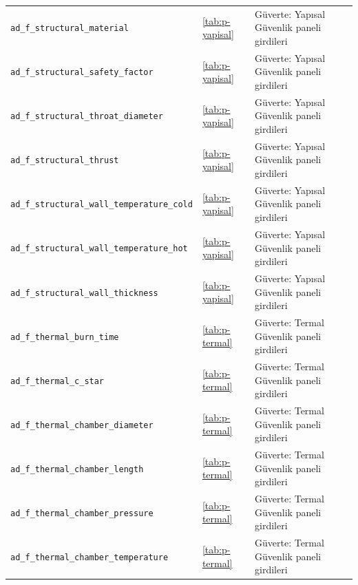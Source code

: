 \documentclass[11pt,a4paper]{article}
\begin{document}
{\begin{longtable}{@{}>{\raggedright\arraybackslash}p{5.2cm}p{1.4cm}>{\raggedright\arraybackslash}p{7.4cm}@{}}
\texttt{ad\_\allowbreak{}f\_\allowbreak{}structural\_\allowbreak{}material} & \ref{tab:p-yapisal} & Güverte: Yapısal Güvenlik paneli girdileri \\
\texttt{ad\_\allowbreak{}f\_\allowbreak{}structural\_\allowbreak{}safety\_\allowbreak{}factor} & \ref{tab:p-yapisal} & Güverte: Yapısal Güvenlik paneli girdileri \\
\texttt{ad\_\allowbreak{}f\_\allowbreak{}structural\_\allowbreak{}throat\_\allowbreak{}diameter} & \ref{tab:p-yapisal} & Güverte: Yapısal Güvenlik paneli girdileri \\
\texttt{ad\_\allowbreak{}f\_\allowbreak{}structural\_\allowbreak{}thrust} & \ref{tab:p-yapisal} & Güverte: Yapısal Güvenlik paneli girdileri \\
\texttt{ad\_\allowbreak{}f\_\allowbreak{}structural\_\allowbreak{}wall\_\allowbreak{}temperature\_\allowbreak{}cold} & \ref{tab:p-yapisal} & Güverte: Yapısal Güvenlik paneli girdileri \\
\texttt{ad\_\allowbreak{}f\_\allowbreak{}structural\_\allowbreak{}wall\_\allowbreak{}temperature\_\allowbreak{}hot} & \ref{tab:p-yapisal} & Güverte: Yapısal Güvenlik paneli girdileri \\
\texttt{ad\_\allowbreak{}f\_\allowbreak{}structural\_\allowbreak{}wall\_\allowbreak{}thickness} & \ref{tab:p-yapisal} & Güverte: Yapısal Güvenlik paneli girdileri \\
\texttt{ad\_\allowbreak{}f\_\allowbreak{}thermal\_\allowbreak{}burn\_\allowbreak{}time} & \ref{tab:p-termal} & Güverte: Termal Güvenlik paneli girdileri \\
\texttt{ad\_\allowbreak{}f\_\allowbreak{}thermal\_\allowbreak{}c\_\allowbreak{}star} & \ref{tab:p-termal} & Güverte: Termal Güvenlik paneli girdileri \\
\texttt{ad\_\allowbreak{}f\_\allowbreak{}thermal\_\allowbreak{}chamber\_\allowbreak{}diameter} & \ref{tab:p-termal} & Güverte: Termal Güvenlik paneli girdileri \\
\texttt{ad\_\allowbreak{}f\_\allowbreak{}thermal\_\allowbreak{}chamber\_\allowbreak{}length} & \ref{tab:p-termal} & Güverte: Termal Güvenlik paneli girdileri \\
\texttt{ad\_\allowbreak{}f\_\allowbreak{}thermal\_\allowbreak{}chamber\_\allowbreak{}pressure} & \ref{tab:p-termal} & Güverte: Termal Güvenlik paneli girdileri \\
\texttt{ad\_\allowbreak{}f\_\allowbreak{}thermal\_\allowbreak{}chamber\_\allowbreak{}temperature} & \ref{tab:p-termal} & Güverte: Termal Güvenlik paneli girdileri \\

\end{longtable}}
\end{document}
